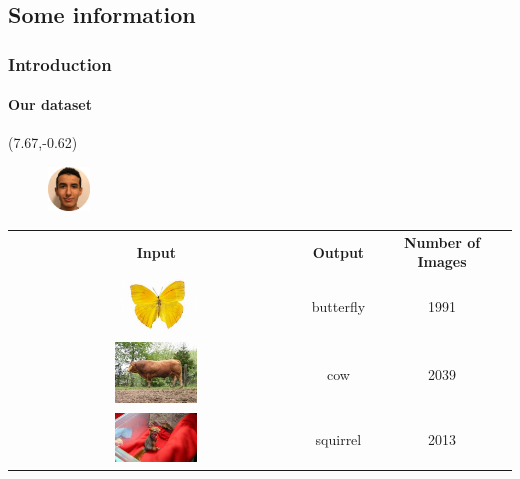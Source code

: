 \subsection{Some information}
\begin{frame}
\frametitle{Introduction}
\framesubtitle{Our dataset} 

\begin{textblock}{15}(7.67,-0.62)
	\begin{figure}[H]
		\includegraphics[width=0.1\textwidth]{Images/Team/MehdiABOUZAID.png} 
	\end{figure}
\end{textblock}

\setlength{\tabcolsep}{10pt} %
\begin{center}
\begin{tabular}{ccc}
\textbf{Input} & \textbf{Output} & \textbf{Number of Images} \\
\includegraphics[valign=m,width=0.29\textwidth]{Images/Dataset/butterfly.jpeg} & butterfly & 1991 \\
\vspace{0.1cm}
\includegraphics[valign=m,width=0.29\textwidth]{Images/Dataset/cow.jpeg} & cow & 2039 \\
\vspace{0.1cm}
\includegraphics[valign=m,width=0.29\textwidth]{Images/Dataset/squirrel.jpeg} & squirrel & 2013  \\
\end{tabular}
\end{center}		 

\end{frame}